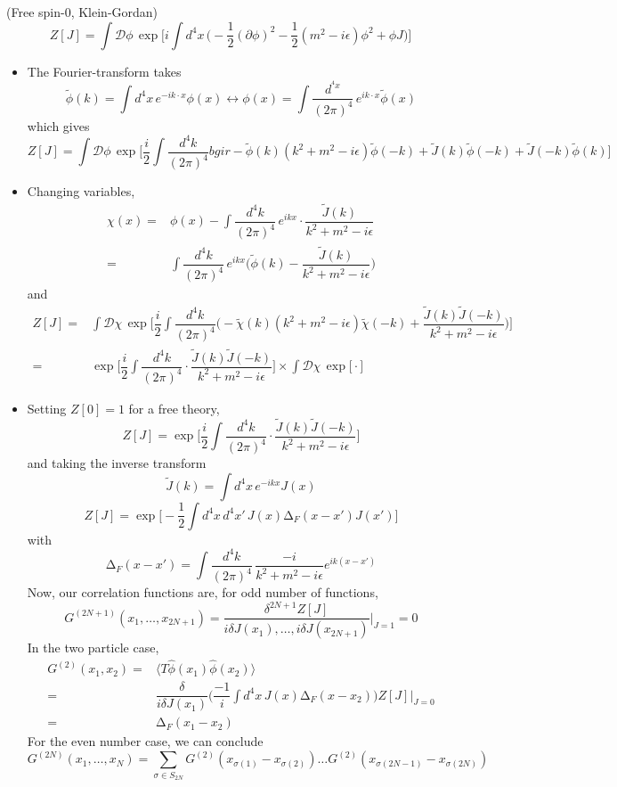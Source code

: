 \begin{ex}
(Free spin-0, Klein-Gordan) 
\[Z[J]=\int \mathcal{D}\phi \,\exp \Big[i\int d^{4}x\,\Big(-\dfrac{1}{2}(\partial \phi )^2-\dfrac{1}{2}(m^2-i\epsilon )\phi ^2+\phi J\Big)\Big]\]
\begin{itemize}
\item[(i)] The Fourier-transform takes
\[\tilde{\phi }(k)=\int d^{4}x\,e^{-ik\cdot x}\phi (x)\leftrightarrow \phi (x)=\int \dfrac{d^{^{4}x}}{(2\pi )^{4}}\,e^{ik\cdot x}\tilde{\phi }(x)\]
which gives
\[Z[J]=\int \mathcal{D}\phi \,\exp \Big[\dfrac{i}{2}\int \dfrac{d^{4}k}{(2\pi )^{4}}bgir-\tilde{\phi }(k)(k^2+m^2-i\epsilon )\tilde{\phi }(-k)+\tilde{J}(k)\tilde{\phi }(-k)+\tilde{J}(-k)\tilde{\phi }(k)\Big]\]
\item[(ii)] Changing variables,
\[\begin{align*}
\chi (x)=&\phi (x)-\int \dfrac{d^{4}k}{(2\pi )^{4}}\,e^{ikx}\cdot \dfrac{\tilde{J}(k)}{k^2+m^2-i\epsilon }\\
=&\int \dfrac{d^{4}k}{(2\pi )^{4}}\,e^{ikx}\Big(\tilde{\phi }(k)-\dfrac{\tilde{J}(k)}{k^2+m^2-i\epsilon }\Big)
\end{align*}\]
and 
\[\begin{align*}
Z[J]=&\int \mathcal{D}\chi \,\exp \Big[\dfrac{i}{2}\int \dfrac{d^{4}k}{(2\pi )^{4}}\Big(-\tilde{\chi }(k)(k^2+m^2-i\epsilon )\tilde{\chi }(-k)+\dfrac{\tilde{J}(k)\tilde{J}(-k)}{k^2+m^2-i\epsilon }\Big)\Big]\\
=&\exp \Big[\dfrac{i}{2}\int \dfrac{d^{4}k}{(2\pi )^{4}}\cdot \dfrac{\tilde{J}(k)\tilde{J}(-k)}{k^2+m^2-i\epsilon }\Big]\times \int \mathcal{D}\chi \,\exp \Big[\cdot \Big]
\end{align*}\]
\item[(iii)] Setting $Z[0]=1$ for a free theory,
\[Z[J]=\exp \Big[\dfrac{i}{2}\int \dfrac{d^{4}k}{(2\pi )^{4}}\cdot \dfrac{\tilde{J}(k)\tilde{J}(-k)}{k^2+m^2-i\epsilon }\Big]\]
and taking the inverse transform
\[\tilde{J}(k)=\int d^{4}x\,e^{-ikx}J(x)\]
\[Z[J]=\exp \Big[-\dfrac{1}{2}\int d^{4}x\,d^{4}x'\,J(x)\mathrm{\Delta }_{F}(x-x')J(x')\Big]\]
with 
\[\mathrm{\Delta }_{F}(x-x')=\int \dfrac{d^{4}k}{(2\pi )^{4}}\,\dfrac{-i}{k^2+m^2-i\epsilon }e^{ik(x-x')}\]
Now, our correlation functions are, for odd number of functions, 
\[G^{(2N+1)}(x_1,\ldots ,x_{2N+1})=\dfrac{\delta ^{2N+1}Z[J]}{i\delta J(x_1),\ldots ,i\delta J(x_{2N+1})}|_{J=1}=0\]
In the two particle case,
\[\begin{align*}
G^{(2)}(x_1,x_2)=&\langle T\hat{\phi }(x_1)\hat{\phi }(x_2)\rangle \\
=&\dfrac{\delta }{i\delta J(x_1)}\Big(\dfrac{-1}{i}\int d^{4}x\,J(x)\mathrm{\Delta }_{F}(x-x_2)\Big)Z[J]|_{J=0}\\
=&\mathrm{\Delta }_{F}(x_1-x_2)
\end{align*}\]
For the even number case, we can conclude
\[G^{(2N)}(x_1,\ldots ,x_{N})=\sum_{\sigma \in S_{2N}} G^{(2)}(x_{\sigma (1)}-x_{\sigma (2)})\ldots G^{(2)}(x_{\sigma (2N-1)}-x_{\sigma (2N)})\]
\end{itemize}
\end{ex}
